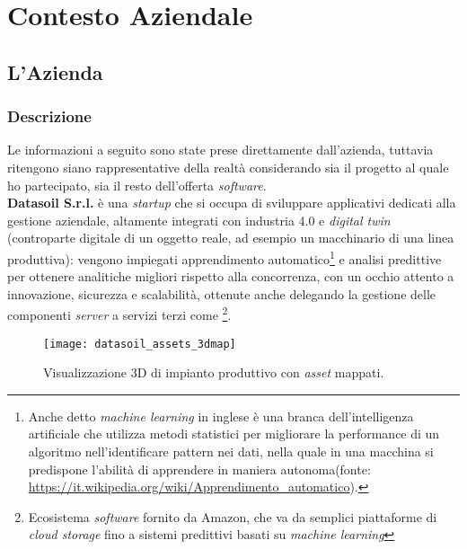 
\chapter{Contesto Aziendale}
\label{cap:contesto-aziendale}

\section{L'Azienda}
\subsection{Descrizione}
Le informazioni a seguito sono state prese direttamente dall'azienda, tuttavia ritengono siano rappresentative della realtà considerando sia il progetto al quale ho partecipato, sia il resto dell'offerta \textit{software}.\\
\textbf{Datasoil S.r.l.} è una \textit{startup} che si occupa di sviluppare applicativi dedicati alla gestione aziendale, altamente integrati con industria 4.0 e \textit{digital twin} (controparte digitale di un oggetto reale, ad esempio un macchinario di una linea produttiva): vengono impiegati apprendimento automatico\footnote{Anche detto \textit{machine learning} in inglese è una branca dell'intelligenza artificiale che utilizza metodi statistici per migliorare la performance di un algoritmo nell'identificare pattern nei dati, nella quale in una macchina si predispone l'abilità di apprendere in maniera autonoma(fonte: \url{https://it.wikipedia.org/wiki/Apprendimento_automatico}).} e analisi predittive per ottenere analitiche migliori rispetto alla concorrenza, con un occhio attento a innovazione, sicurezza e scalabilità, ottenute anche delegando la gestione delle componenti \textit{server} a servizi terzi come \aws{}\footnote{Ecosistema \textit{software} fornito da Amazon, che va da semplici piattaforme di \textit{cloud storage} fino a sistemi predittivi basati su \textit{machine learning}}.
\begin{figure}[H]
    \centering
    \texttt{[image: datasoil\_assets\_3dmap]}
    \caption[Visualizzazione 3D di impianto produttivo]{Visualizzazione 3D di impianto produttivo con \textit{asset} mappati.\footnotemark}
\end{figure}

